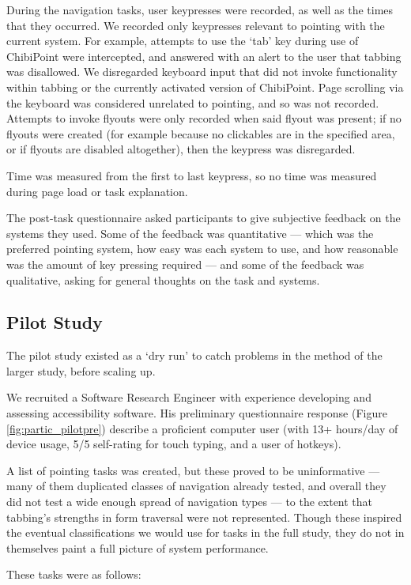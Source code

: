 \documentclass[a4paper, 12pt]{report}
\begin{document}
During the navigation tasks, user keypresses were recorded, as well as the times that they occurred. We recorded only keypresses relevant to pointing with the current system. For example, attempts to use the `tab' key during use of ChibiPoint were intercepted, and answered with an alert to the user that tabbing was disallowed. We disregarded keyboard input that did not invoke functionality within tabbing or the currently activated version of ChibiPoint. Page scrolling via the keyboard was considered unrelated to pointing, and so was not recorded. Attempts to invoke flyouts were only recorded when said flyout was present; if no flyouts were created (for example because no clickables are in the specified area, or if flyouts are disabled altogether), then the keypress was disregarded.

Time was measured from the first to last keypress, so no time was measured during page load or task explanation.

The post-task questionnaire asked participants to give subjective feedback on the systems they used. Some of the feedback was quantitative --- which was the preferred pointing system, how easy was each system to use, and how reasonable was the amount of key pressing required --- and some of the feedback was qualitative, asking for general thoughts on the task and systems.

\subsection{Pilot Study}
The pilot study existed as a `dry run' to catch problems in the method of the larger study, before scaling up.

We recruited a Software Research Engineer with experience developing and assessing accessibility software. His preliminary questionnaire response (Figure \ref{fig:partic_pilotpre}) describe a proficient computer user (with 13+ hours/day of device usage, 5/5 self-rating for touch typing, and a user of hotkeys).

A list of pointing tasks was created, but these proved to be uninformative --- many of them duplicated classes of navigation already tested, and overall they did not test a wide enough spread of navigation types --- to the extent that tabbing's strengths in form traversal were not represented. Though these inspired the eventual classifications we would use for tasks in the full study, they do not in themselves paint a full picture of system performance.

These tasks were as follows:
\end{document}
